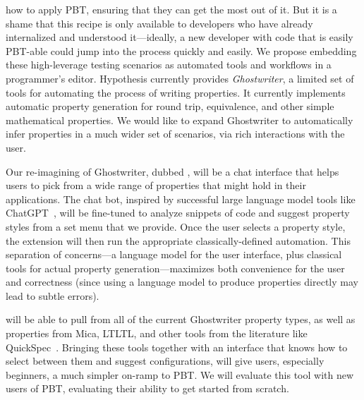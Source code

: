 how to apply PBT, ensuring that they can get the most out of it.  But it is
a shame that this recipe is only available to developers who have already
internalized and understood it---ideally, a new developer with code that is
easily PBT-able could jump into the process quickly and easily.  We propose
embedding these high-leverage testing scenarios as automated tools and workflows
in a programmer's editor.
%
Hypothesis currently provides {\em Ghostwriter}, a limited set of tools for
automating the process of writing properties. It currently implements automatic
property generation for round trip, equivalence, and other simple mathematical
properties.  We would like to expand Ghostwriter to automatically infer
properties in a much wider set of scenarios, via rich interactions with the
user.

Our re-imagining of Ghostwriter, dubbed {\em \GhostChat}, will be a chat
interface that helps users to pick from a wide range of properties that might
hold in their applications. The chat bot, inspired by successful large language
model tools like ChatGPT~\cn{}, will be fine-tuned to analyze snippets of code
and suggest property styles from a set menu that we provide. Once the user
selects a property style, the extension will then run the appropriate
classically-defined automation. This separation of concerns---a language model
for the user interface, plus classical tools for actual property
generation---maximizes both convenience for the user and correctness (since
using a language model to produce properties directly may lead to subtle
errors). 

\GhostChat{} will be able to pull from all of the current Ghostwriter
property types, as well as properties from Mica, LTLTL, and other tools from the
literature like QuickSpec~\cite{ref:claessen2010quickspec}. Bringing these tools
together with an interface that knows how to select between them and suggest
configurations, will give users, especially beginners, a much simpler on-ramp to
PBT.   We will evaluate this tool with new users of PBT, evaluating their ability
to get started from scratch.

